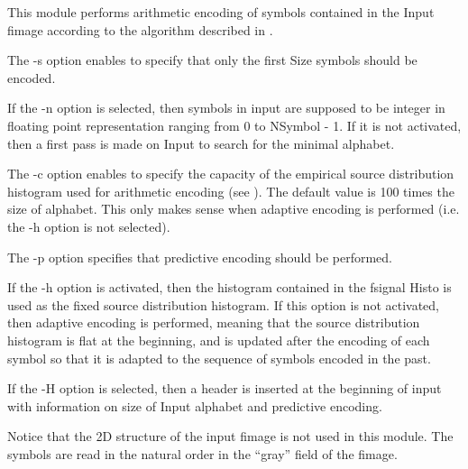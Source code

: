 This module performs arithmetic encoding of symbols contained in the Input 
fimage according to the algorithm described in \cite{witten.neal.ea:arithmetic}. 

The -s option enables to specify that only the first Size symbols should 
be encoded. 

If the -n option is selected, then symbols in input are supposed to be 
integer in floating point representation ranging from 0 to NSymbol - 1. 
If it is not activated, then a first pass is made on Input to search 
for the minimal alphabet. 

The -c option enables to specify the capacity of the empirical source 
distribution histogram used for arithmetic encoding (see 
\cite{witten.neal.ea:arithmetic}). 
The default value is 100 times the size of alphabet. This only makes sense 
when adaptive encoding is performed (i.e. the -h option is not selected). 

The -p option specifies that predictive encoding should be performed. 

If the -h option is activated, then the histogram contained in the fsignal 
Histo is used as the fixed source distribution histogram.  
If this option is not activated, then adaptive encoding is performed, 
meaning that the source distribution histogram is flat at the beginning, 
and is updated after the encoding of each symbol so that it is 
adapted to the sequence of symbols encoded in the past. 

If the -H option is selected, then a header is inserted at the beginning 
of input with information on size of Input alphabet and predictive encoding. 

Notice that the 2D structure of the input fimage is not used in this module. 
The symbols are read in the natural order in the ``gray'' field of the fimage. 

